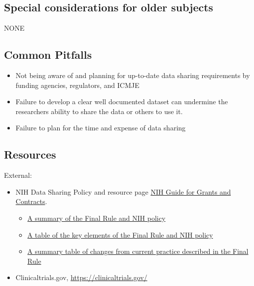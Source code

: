 \documentclass[]{book}
\providecommand{\tightlist}{%
  \setlength{\itemsep}{0pt}\setlength{\parskip}{0pt}}
\begin{document}
\subsection{Special considerations for older
subjects}\label{special-considerations-for-older-subjects-14}

NONE

\subsection{Common Pitfalls}\label{common-pitfalls-16}

\begin{itemize}
\tightlist
\item
  Not being aware of and planning for up-to-date data sharing
  requirements by funding agencies, regulators, and ICMJE
\item
  Failure to develop a clear well documented dataset can undermine the
  researchers ability to share the data or others to use it.
\item
  Failure to plan for the time and expense of data sharing
\end{itemize}

\subsection{Resources}\label{resources-17}

External:

\begin{itemize}
\item
  NIH Data Sharing Policy and resource page
  \href{http://grants.nih.gov/grants/guide/notice-files/NOT-OD-16-149.html}{NIH
  Guide for Grants and Contracts}.

  \begin{itemize}
  \tightlist
  \item
    \href{https://www.nih.gov/news-events/summary-hhs-nih-initiatives-enhance-availability-clinical-trial-information}{A
    summary of the Final Rule and NIH policy}
  \item
    \href{https://www.nih.gov/news-events/summary-table-hhs-nih-initiatives-enhance-availability-clinical-trial-information}{A
    table of the key elements of the Final Rule and NIH policy}
  \item
    \href{https://prsinfo.clinicaltrials.gov/FinalRuleChanges-16Sept2016.pdf}{A
    summary table of changes from current practice described in the
    Final Rule}
  \end{itemize}
\item
  Clinicaltrials.gov, \url{https://clinicaltrials.gov/}
\end{itemize}
\end{document}
